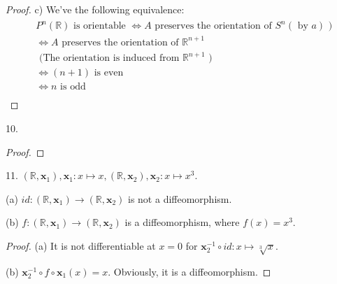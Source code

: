 \begin{proof}
c) We've the following equivalence:
\begin{align*}
\begin{aligned}
& P^n(\mathbb{R}) \text { is orientable } \Leftrightarrow A \text { preserves the orientation of } S^n(\text { by } a) \text { ) } \\
& \Leftrightarrow A \text { preserves the orientation of } \mathbb{R}^{n+1} \\
& \text { (The orientation is induced from } \mathbb{R}^{n+1} \text { ) } \\
& \Leftrightarrow(n+1) \text { is even } \\
& \Leftrightarrow n \text { is odd } \\
&
\end{aligned}
\end{align*}
\end{proof}
10.
\begin{proof}
    
\end{proof}

11. $\left(\mathbb{R}, \mathbf{x}_1\right), \mathbf{x}_1: x \mapsto x,\left(\mathbb{R}, \mathbf{x}_2\right), \mathbf{x}_2: x \mapsto x^3$.

    (a) $i d:\left(\mathbb{R}, \mathbf{x}_1\right) \rightarrow\left(\mathbb{R}, \mathbf{x}_2\right)$ is not a diffeomorphism.

    (b) $f:\left(\mathbb{R}, \mathbf{x}_1\right) \rightarrow\left(\mathbb{R}, \mathbf{x}_2\right)$ is a diffeomorphism, where $f(x)=x^3$.
\begin{proof}
(a) It is not differentiable at $x=0$ for $\mathbf{x}_2^{-1} \circ i d: x \mapsto \sqrt[3]{x}$.

(b) $\mathbf{x}_2^{-1} \circ f \circ \mathbf{x}_1(x)=x$. Obviously, it is a diffeomorphism.
\end{proof}





























